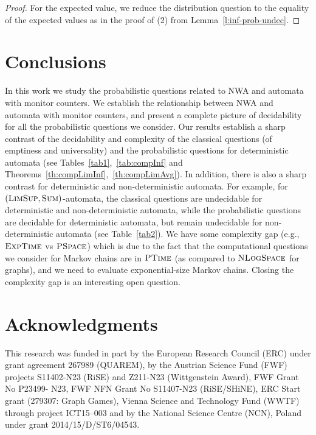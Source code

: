 \documentclass{lmcs}
\newcommand{\EXPTIME}{\textsc{ExpTime}{}}
\newcommand{\PTIME}{\textsc{PTime}{}}
\newcommand{\PSPACE}{\textsc{PSpace}{}}
\newcommand{\NLOGSPACE}{\textsc{NLogSpace}{}}
\newcommand{\fsum}{\textsc{Sum}}
\newcommand{\flimsup}{\textsc{LimSup}}
\begin{document}
\begin{proof}
For the expected value, we reduce the distribution question to the equality of the expected values as in the proof of (2) from Lemma~\ref{l:inf-prob-undec}.
\end{proof}




\section{Conclusions}
In this work we study the probabilistic questions related to NWA and
automata with monitor counters.
We establish the relationship between NWA and automata with monitor counters,
and present a complete picture of decidability for all the
probabilistic questions we consider.
Our results establish a sharp contrast of the decidability and complexity
of the classical questions (of emptiness and universality) and
the probabilistic questions for deterministic automata
(see Tables~\ref{tab1},~\ref{tab:compInf} and Theorems~\ref{th:compLimInf},~\ref{th:compLimAvg}).
In addition, there is also a sharp contrast for deterministic and
non-deterministic automata.
For example, for $(\flimsup,\fsum)$-automata, the classical questions are
undecidable for deterministic and non-deterministic automata, while the
probabilistic questions are decidable for deterministic automata, but remain
undecidable for non-deterministic automata (see Table~\ref{tab2}).
We have some complexity gap (e.g., $\EXPTIME$ vs $\PSPACE$) which is due to the fact
that the computational questions we consider for Markov chains are in $\PTIME$
(as compared to $\NLOGSPACE$ for graphs), and we need to evaluate exponential-size
Markov chains. Closing the complexity gap is an interesting open question.






\section{Acknowledgments}
{
This research was funded in part by the European Research Council (ERC) under grant
agreement 267989 (QUAREM), by the Austrian Science Fund (FWF) projects S11402-N23 (RiSE) and Z211-N23 (Wittgenstein Award),
FWF Grant No P23499- N23, FWF NFN Grant No S11407-N23 (RiSE/SHiNE),
ERC Start grant (279307: Graph Games), Vienna Science and Technology Fund (WWTF) through project ICT15--003 and
by the National Science Centre (NCN), Poland under grant 2014/15/D/ST6/04543.}





\end{document}
